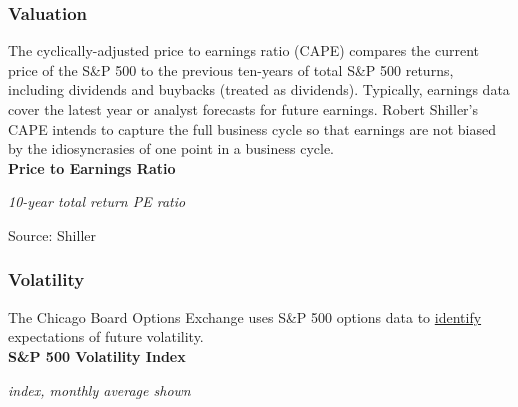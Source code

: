 \documentclass{report}
\makeatletter
\newcommand{\tbllink}[1]{\href{https://raw.githubusercontent.com/bdecon/US-chartbook/master/chartbook/data/#1}{\faTable}}
\newcommand*\short[1]{\expandafter\@gobbletwo\number\numexpr#1\relax}
\newcommand{\dateaxisticks}{
		date coordinates in=x, axis line style={draw=none},
		xmax={2020-08-10},
		max space between ticks=40,	    
		xtick={{1990-01-01}, {1992-01-01}, {1994-01-01}, 
			{1996-01-01}, {1998-01-01}, {2000-01-01}, 
			{2002-01-01}, {2004-01-01}, {2006-01-01},
			{2008-01-01}, {2010-01-01}, {2012-01-01}, {2014-01-01},
		    {2016-01-01}, {2018-01-01}, {2020-01-01}},
		minor xtick={{1989-01-01}, {1991-01-01}, {1993-01-01},
			{1995-01-01}, {1997-01-01}, {1999-01-01}, 
			{2001-01-01}, {2003-01-01}, {2005-01-01}, {2007-01-01},
		    {2009-01-01}, {2011-01-01}, {2013-01-01}, {2015-01-01},
		    {2017-01-01}, {2019-01-01}},
		enlarge y limits={0.06}, enlarge x limits={0.01},
		}
\newcommand{\bbar}[2]{extra #1 ticks = {{#2}}, extra #1 tick labels = ,
		extra #1 tick style = {grid=major, grid style={thick, black!25}},}
\newcommand{\stdline}[4]{\addplot[very thick, no markers, color=#1] 
		table [x=#2, y=#3, col sep=comma] {#4};	}
\newcommand{\rbars}{
		\fill[color=black!10] (axis cs:{1990-07-01},\pgfkeysvalueof{/pgfplots/ymin}) rectangle 
			(axis cs:{1991-03-01}, \pgfkeysvalueof{/pgfplots/ymax});
		\fill[color=black!10] (axis cs:{2007-12-01},\pgfkeysvalueof{/pgfplots/ymin}) rectangle 
			(axis cs:{2009-07-01}, \pgfkeysvalueof{/pgfplots/ymax});
		\fill[color=black!10] (axis cs:{2001-03-01},\pgfkeysvalueof{/pgfplots/ymin}) rectangle 
			(axis cs:{2001-11-01}, \pgfkeysvalueof{/pgfplots/ymax});
		\fill[color=black!10] (axis cs:{2020-02-01},\pgfkeysvalueof{/pgfplots/ymin}) rectangle 
			(axis cs:{2020-09-01}, \pgfkeysvalueof{/pgfplots/ymax});}
\makeatother
\begin{document}
{{{{{{{{{\begin{minipage}{0.76\textwidth}
\vspace{4mm}

\subsubsection*{\color{black!70} \seriffont Valuation}

\small The cyclically-adjusted price to earnings ratio (CAPE) compares the current price of the S\&P 500 to the previous ten-years of total S\&P 500 returns, including dividends and buybacks (treated as dividends). Typically, earnings data cover the latest year or analyst forecasts for future earnings. Robert Shiller's CAPE intends to capture the full business cycle so that earnings are not biased by the idiosyncrasies of one point in a business cycle. \\


\normalsize \textbf{Price to Earnings Ratio}

\footnotesize{\textit{10-year total return PE ratio}}

\hspace*{-2mm} 

\footnotesize{Source: Shiller} \hfill \tbllink{catrpe.csv}


\vspace{4mm}

\subsubsection*{\color{black!70} \seriffont Volatility}

\small The Chicago Board Options Exchange uses S\&P 500 options data to \href{http://www.cboe.com/vix}{identify} expectations of future volatility. \\


\normalsize \textbf{S\&P 500 Volatility Index}

\footnotesize{\textit{index, monthly average shown}}

\hspace*{-2mm} 


\end{minipage}}}}}}}}}}
\end{document}
